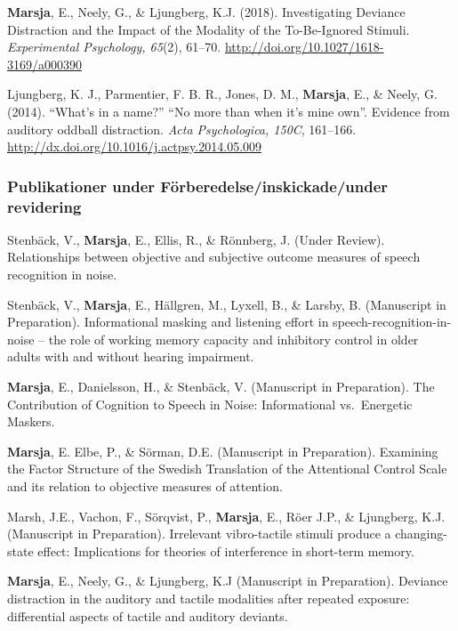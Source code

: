 \documentclass[]{article}
\begin{document}
\textbf{Marsja}, E., Neely, G., \& Ljungberg, K.J. (2018). Investigating
Deviance Distraction and the Impact of the Modality of the To-Be-Ignored
Stimuli. \emph{Experimental Psychology, 65}(2), 61--70.
\url{http://doi.org/10.1027/1618-3169/a000390}

Ljungberg, K. J., Parmentier, F. B. R., Jones, D. M., \textbf{Marsja},
E., \& Neely, G. (2014). ``What's in a name?'' ``No more than when it's
mine own''. Evidence from auditory oddball distraction. \emph{Acta
Psychologica, 150C}, 161--166.
\url{http://dx.doi.org/10.1016/j.actpsy.2014.05.009}

\hypertarget{publikationer-under-fuxf6rberedelseinskickadeunder-revidering}{%
\subsubsection{Publikationer under Förberedelse/inskickade/under
revidering}\label{publikationer-under-fuxf6rberedelseinskickadeunder-revidering}}

Stenbäck, V., \textbf{Marsja}, E., Ellis, R., \& Rönnberg, J. (Under
Review). Relationships between objective and subjective outcome measures
of speech recognition in noise.

Stenbäck, V., \textbf{Marsja}, E., Hällgren, M., Lyxell, B., \& Larsby,
B. (Manuscript in Preparation). Informational masking and listening
effort in speech-recognition-in-noise -- the role of working memory
capacity and inhibitory control in older adults with and without hearing
impairment.

\textbf{Marsja}, E., Danielsson, H., \& Stenbäck, V. (Manuscript in
Preparation). The Contribution of Cognition to Speech in Noise:
Informational vs.~Energetic Maskers.

\textbf{Marsja}, E. Elbe, P., \& Sörman, D.E. (Manuscript in
Preparation). Examining the Factor Structure of the Swedish Translation
of the Attentional Control Scale and its relation to objective measures
of attention.

Marsh, J.E., Vachon, F., Sörqvist, P., \textbf{Marsja}, E., Röer J.P.,
\& Ljungberg, K.J. (Manuscript in Preparation). Irrelevant vibro-tactile
stimuli produce a changing-state effect: Implications for theories of
interference in short-term memory.

\textbf{Marsja}, E., Neely, G., \& Ljungberg, K.J (Manuscript in
Preparation). Deviance distraction in the auditory and tactile
modalities after repeated exposure: differential aspects of tactile and
auditory deviants.
\end{document}
